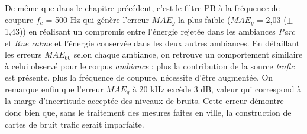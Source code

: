 \begin{table}[h]
\caption{Erreurs moyennes $MAE_{g}$ et $MAE_{60}$ pour l'estimateur \textit{baseline} pour le corpus d'évaluation \textit{SOUR}, en gras-rouge la plus faible erreur $MAE_g$, en gras-noir les erreurs $MAE_{60}$ les plus faibles.}
\label{tab:grafic_baseline}
\centering
{}
\end{table}

De même que dans le chapitre précédent, c'est le filtre PB à la fréquence de coupure $f_c$ = 500 Hz qui génère l'erreur $MAE_g$ la plus faible ($MAE_g$ = 2,03 ($\pm$ 1,43)) en réalisant un compromis entre l'énergie rejetée dans les ambiances \textit{Parc} et \textit{Rue calme} et l'énergie conservée dans les deux autres ambiances. En détaillant les erreurs $MAE_{60}$ selon chaque ambiance, on retrouve un comportement similaire à celui observé pour le corpus \textit{ambiance} : plus la contribution de la source \textit{trafic} est présente, plus la fréquence de coupure, nécessite d'être augmentée. 
On remarque enfin que l'erreur $MAE_g$ à 20 kHz excède 3 dB, valeur qui correspond à la marge d'incertitude acceptée des niveaux de bruits. Cette erreur démontre donc bien que, sans le traitement des mesures faites en ville, la construction de cartes de bruit trafic serait imparfaite.

